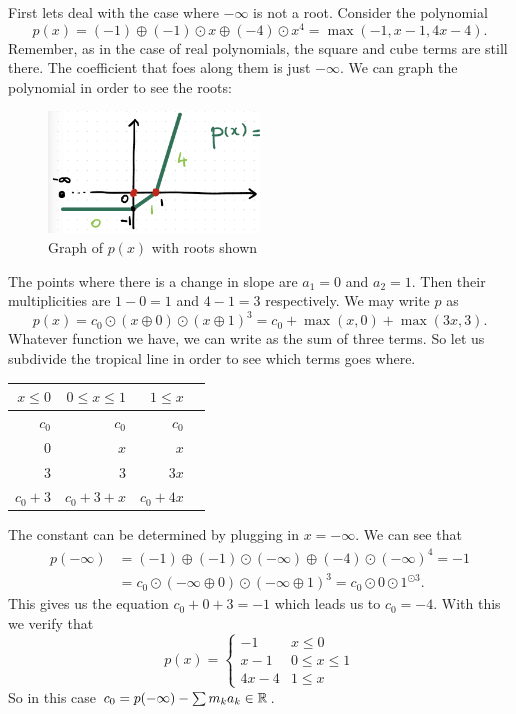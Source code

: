 \documentclass[12pt]{memoir}
\begin{document}
\begin{Ex}
First lets deal with the case where $-\infty$ is not a root. Consider the polynomial 
$$p(x)=(-1)\oplus(-1)\odot x\oplus(-4)\odot x^4=\max(-1,x-1,4x-4).$$
Remember, as in the case of real polynomials, the square and cube terms are still there. The coefficient that foes along them is just $-\infty$. We can graph the polynomial in order to see the roots:
\begin{figure}[h!]
    \centering
    \includegraphics[width=0.5\textwidth]{figs/fig4-1-InfinityNotRoot.png}
    \caption{Graph of $p(x)$ with roots shown}
    \label{fig:4.1-InfinityNotRoot}
\end{figure}
The points where there is a change in slope are $a_1=0$ and $a_2=1$. Then their multiplicities are $1-0=1$ and $4-1=3$ respectively. We may write $p$ as 
$$p(x)=c_0\odot(x\oplus 0)\odot(x\oplus 1)^{3}=c_0+\max(x,0)+\max(3x,3).$$
Whatever function we have, we can write as the sum of three terms. So let us subdivide the tropical line in order to see which terms goes where.
\begin{table}[h!]
    \centering
    \begin{tabular}{rrrr}\toprule
        $x\leq 0$ & $0\leq x\leq 1$ & $1\leq x$\\ \midrule
        $c_0$& $c_0$&$c_0$\\
        $0$&$x$ & $x$\\
        $3$& $3$ & $3x$\\ \midrule
        $c_0+3$&$c_0+3+x$&$c_0+4x$\\
   \bottomrule
    \end{tabular}
    \end{table}
    The constant can be determined by plugging in $x=-\infty$. We can see that 
    \begin{align*}
        p(-\infty)&=(-1)\oplus(-1)\odot (-\infty)\oplus(-4)\odot (-\infty)^4=-1\\
        &=c_0\odot(-\infty\oplus 0)\odot(-\infty\oplus 1)^3=c_0\odot0\odot 1^{\odot 3}.
    \end{align*}
    This gives us the equation $c_0+0+3=-1$ which leads us to $c_0=-4$. With this we verify that 
    $$p(x)=\begin{cases}
        -1&x\leq 0\\
        x-1&0\leq x\leq 1\\
        4x-4&1\leq x
    \end{cases}$$
    So in this case $c_0=p(-\infty)-\sum m_ka_k\in\mathbb{R}$.
\end{Ex}
\end{document}

